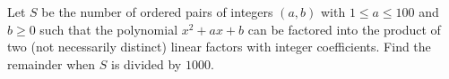Let $S$ be the number of ordered pairs of integers $(a,b)$ with $1\le a\le100$ and $b\ge0$ such that the polynomial $x^2+ax+b$ can be factored into the product of two (not necessarily distinct) linear factors with integer coefficients. Find the remainder when $S$ is divided by $1000$.
